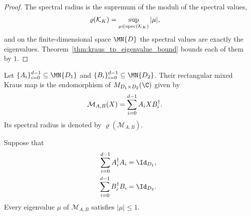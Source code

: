 \begin{proof}\leanok
    The spectral radius is the supremum of the moduli of the spectral
    values,
    \begin{align}
        \varrho(\mathcal K_K)
         & =\sup_{\mu\in\operatorname{spec}(\mathcal K_K)}|\mu|,
        \notag
    \end{align}
    and on the finite-dimensional space $\MN{D}$ the spectral values are
    exactly the eigenvalues. Theorem~\ref{thm:kraus_tp_eigenvalue_bound}
    bounds each of them by $1$.
\end{proof}

\begin{definition}
    \label{def:kraus_mixed_map_spectral_radius}
    \leanok
    Let $\{A_i\}_{i=0}^{d-1}\subseteq\MN{D_1}$ and
    $\{B_i\}_{i=0}^{d-1}\subseteq\MN{D_2}$. Their rectangular mixed Kraus
    map is the endomorphism of $M_{D_1\times D_2}(\C)$ given by
    \begin{align}
        \mathcal M_{A,B}(X)
         & =\sum_{i=0}^{d-1}A_iXB_i^\dagger.
        \notag
    \end{align}
    Its spectral radius is denoted by $\varrho(\mathcal M_{A,B})$.
\end{definition}

\begin{theorem}
    \label{thm:kraus_mixed_tp_eigenvalue_bound}
    \leanok
    Suppose that
    \begin{align}
        \sum_{i=0}^{d-1}A_i^\dagger A_i&=\Id_{D_1},
        \notag\\
        \sum_{i=0}^{d-1}B_i^\dagger B_i&=\Id_{D_2}.
        \notag
    \end{align}
    Every eigenvalue $\mu$ of $\mathcal M_{A,B}$ satisfies $|\mu|\leq1$.
\end{theorem}


